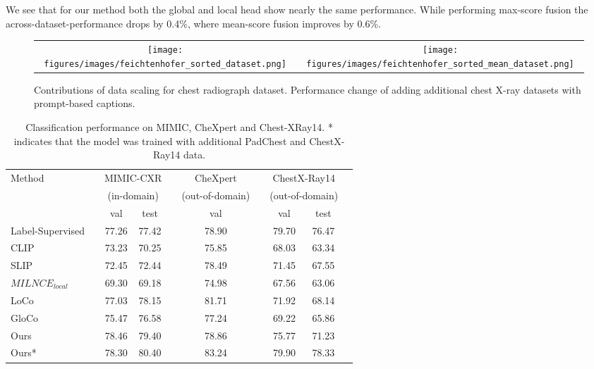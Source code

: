 \documentclass[runningheads]{llncs}
\begin{document}
We see that for our method both the global and local head show nearly the same performance. While performing max-score fusion the across-dataset-performance drops by 0.4\%, where mean-score fusion improves by 0.6\%.
\begin{figure*}[t]
    \centering
    \begin{tabular}{cc}
       \texttt{[image: figures/images/feichtenhofer\_sorted\_dataset.png]}  &  \texttt{[image: figures/images/feichtenhofer\_sorted\_mean\_dataset.png]}
    \end{tabular}
    
    \caption{Contributions of data scaling for chest radiograph dataset.  Performance change of adding additional chest X-ray datasets with prompt-based captions.}
    \label{fig:data}
\end{figure*} \begin{table}[h]
    \centering
    \begin{tabular}{lccccccccc}
    \toprule
    \multirow{3}{*}{Method} & & \multicolumn{2}{c}{MIMIC-CXR }  && \multicolumn{1}{c}{CheXpert } && \multicolumn{2}{c}{ChestX-Ray14 } \\
    & &  \multicolumn{2}{c}{(in-domain)} &&  \multicolumn{1}{c}{(out-of-domain)} &&  \multicolumn{2}{c}{(out-of-domain)} \\ 
    & &  val & test &&   val &&  val & test \\ 
    
    \midrule
    Label-Supervised & & 77.26 & 77.42 & & 78.90 & & 79.70 &  76.47  \\
    \midrule
    CLIP                          & & 73.23 & 70.25 & & 75.85 & & 68.03 & 63.34  \\
    SLIP                          & & 72.45 & 72.44 & & 78.49 & & 71.45 & 67.55  \\
    \midrule
    $MILNCE_{local}$                & & 69.30 & 69.18 & & 74.98 & & 67.56 & 63.06 \\
    LoCo                          & & 77.03 & 78.15 & & 81.71 & & 71.92 & 68.14  \\
    GloCo                         & & 75.47 & 76.58 & & 77.24 & & 69.22 & 65.86  \\
    Ours                          & & 78.46 & 79.40 & & 78.86 & & 75.77 & 71.23  \\
    \midrule
    Ours*                         & & 78.30 & 80.40 & & 83.24 & & 79.90 & 78.33  \\
     \bottomrule
    \end{tabular}
    \caption{Classification performance on MIMIC, CheXpert and Chest-XRay14. * indicates that the model was trained with additional PadChest and ChestX-Ray14 data.}
    \label{tab:final}
\end{table}
\end{document}
